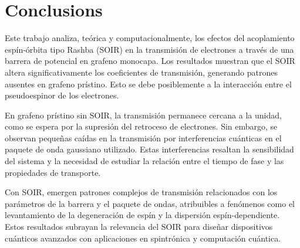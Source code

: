 \documentclass[twocolumn]{revtex4-2}
\begin{document}
    \section{Conclusions}\label{sec:conclusions}

Este trabajo analiza, teórica y computacionalmente, los efectos del acoplamiento espín-órbita tipo Rashba (SOIR) en la transmisión de electrones a través de una barrera de potencial en grafeno monocapa.
Los resultados muestran que el SOIR altera significativamente los coeficientes de transmisión, generando patrones ausentes en grafeno prístino.
Esto se debe posiblemente a la interacción entre el pseudoespinor de los electrones.

En grafeno prístino sin SOIR, la transmisión permanece cercana a la unidad, como se espera por la supresión del retroceso de electrones.
Sin embargo, se observan pequeñas caídas en la transmisión por interferencias cuánticas en el paquete de onda gaussiano utilizado.
Estas interferencias resaltan la sensibilidad del sistema y la necesidad de estudiar la relación entre el tiempo de fase y las propiedades de transporte.

Con SOIR, emergen patrones complejos de transmisión relacionados con los parámetros de la barrera y el paquete de ondas, atribuibles a fenómenos como el levantamiento de la degeneración de espín y la dispersión espín-dependiente.
Estos resultados subrayan la relevancia del SOIR para diseñar dispositivos cuánticos avanzados con aplicaciones en spintrónica y computación cuántica.


    
    
\end{document}
